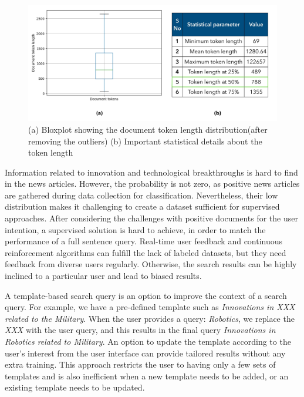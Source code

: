 \documentclass[master,proposal,extern,palatino]{rgseThesis}
\begin{document}
 \begin{figure}[h]
	\centering
	\includegraphics[width=.8\textwidth]{images/keynotes_images/token_length_distribution.jpg}
	\caption{(a) Bloxplot showing the document token length distribution(after removing the outliers) (b) Important statistical details about the token length  \label{fig:token_length_distribution}}
\end{figure}



	Information related to innovation and technological breakthroughs is hard to find in the news articles. However, the probability is not zero, as positive news articles
	are gathered during data collection for classification. Nevertheless, their low distribution makes it challenging to create a dataset sufficient for supervised approaches. After considering the challenges with positive documents for the user intention, a supervised solution is hard to achieve, in order to match the performance of a full sentence query.  Real-time user feedback and continuous reinforcement
	algorithms can fulfill the lack of labeled datasets, but they need feedback from diverse
	users regularly. Otherwise, the search results can be highly inclined to a particular user and
	lead to biased results.
	


A template-based search query is an option to improve the context of a search query. For example, we have a pre-defined template such as \textit{Innovations in XXX related to the Military}. When the user provides a query: \textit{Robotics}, we replace the \textit{XXX} with the user query, and this results in the final query  \textit{Innovations in Robotics related to Military}. An option to update the template according to the user's interest from the user interface can provide tailored results without any extra training. This approach restricts the user to having only a few sets of templates and is also inefficient when a new template needs to be added, or an existing template needs to be updated. 
\end{document}
